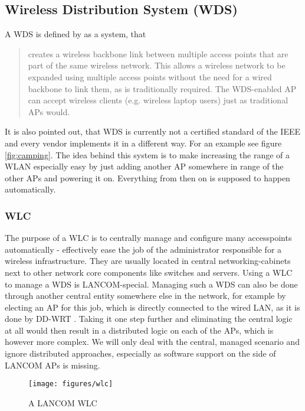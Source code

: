 \newpage
	      
    \subsection{Wireless Distribution System (WDS)}
      A \ac{WDS} is defined by \cite{dd_wrt} as a system, that
      
      \begin{quote}
	creates a wireless backbone link between multiple access points that are part of the same wireless network. 
	This allows a wireless network to be expanded using multiple access points without the need for a wired backbone to link them, as is traditionally required. 
	The WDS-enabled AP can accept wireless clients (e.g. wireless laptop users) just as traditional APs would.
      \end{quote}

      It is also pointed out, that WDS is currently not a certified standard of the IEEE and every vendor implements it in a different way.
      For an example see figure \ref{fig:camping}. The idea behind this system is to make increasing the range of a WLAN especially easy by just adding another AP somewhere in
      range of the other APs and powering it on. Everything from then on is supposed to happen automatically.
      
      \subsubsection{\ac{WLC}}
	The purpose of a \ac{WLC} is to centrally manage and configure many accesspoints automatically - effectively ease the job of the administrator responsible for a 
	wireless infrastructure. They are usually located in central networking-cabinets next to other network core components like switches and servers.
	Using a WLC to manage a WDS is LANCOM-special. Managing such a WDS can also be done through another central entity somewhere else in the network, for example by
	electing an AP for this job, which is directly connected to the wired LAN, as it is done by DD-WRT \cite{dd_wrt}. Taking it one step further and eliminating the
	central logic at all would then result in a distributed logic on each of the APs, which is however more complex. We will only deal with the central, managed scenario
	and ignore distributed approaches, especially as software support on the side of LANCOM APs is missing.
	
	\begin{figure}[h!]
	  \centering
	  \texttt{[image: figures/wlc]}
	  \caption{A LANCOM \ac{WLC}}
	  \label{fig:wlc}
	\end{figure}
	

